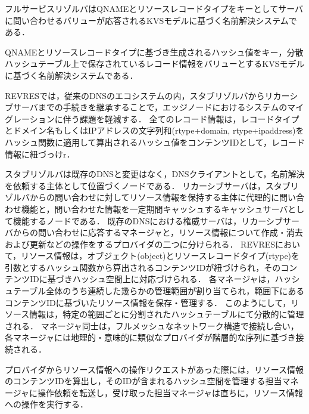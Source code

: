 

フルサービスリゾルバはQNAMEとリソースレコードタイプをキーとしてサーバに問い合わせるバリューが応答されるKVSモデルに基づく名前解決システムである．

QNAMEとリソースレコードタイプに基づき生成されるハッシュ値をキー，分散ハッシュテーブル上で保存されているレコード情報をバリューとするKVSモデルに基づく名前解決システムである．

REVRESでは，従来のDNSのエコシステムの内，スタブリゾルバからリカーシブサーバまでの手続きを継承することで，エッジノードにおけるシステムのマイグレーションに伴う課題を軽減する．
全てのレコード情報は，レコードタイプとドメイン名もしくはIPアドレスの文字列和(rtype+domain, rtype+ipaddress)をハッシュ関数に適用して算出されるハッシュ値をコンテンツIDとして，レコード情報に紐づっけr．




スタブリゾルバは既存のDNSと変更はなく，DNSクライアントとして，名前解決を依頼する主体として位置づくノードである．
リカーシブサーバは，スタブリゾルバからの問い合わせに対してリソース情報を保持する主体に代理的に問い合わせ機能と，問い合わせた情報を一定期間キャッシュするキャッシュサーバとして機能するノードである．
既存のDNSにおける権威サーバは，リカーシブサーバからの問い合わせに応答するマネージャと，リソース情報について作成・消去および更新などの操作をするプロバイダの二つに分けられる．
REVRESにおいて，リソース情報は，オブジェクト(object)とリソースレコードタイプ(rtype)を引数とするハッシュ関数から算出されるコンテンツIDが紐づけられ，そのコンテンツIDに基づきハッシュ空間上に対応づけられる．
各マネージャは，ハッシュテーブル全体のうち連続した幾らかの管理範囲が割り当てられ，範囲下にあるコンテンツIDに基づいたリソース情報を保存・管理する．
このようにして，リソース情報は，特定の範囲ごとに分割されたハッシュテーブルにて分散的に管理される．
マネージャ同士は，フルメッシュなネットワーク構造で接続し合い，各マネージャには地理的・意味的に類似なプロバイダが階層的な序列に基づき接続される．

プロバイダからリソース情報への操作リクエストがあった際には，リソース情報のコンテンツIDを算出し，そのIDが含まれるハッシュ空間を管理する担当マネージャに操作依頼を転送し，受け取った担当マネージャは直ちに，リソース情報への操作を実行する．




